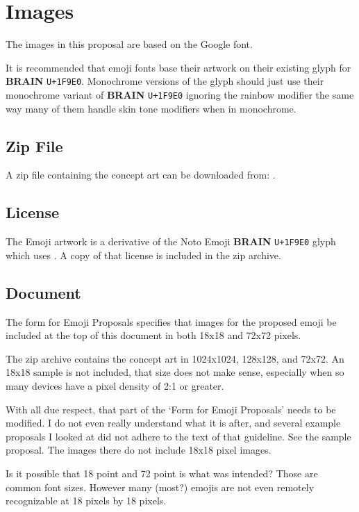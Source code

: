 \section{Images}

The images in this proposal are based on the Google\textsuperscript{\textregistered}
 font.

It is recommended that emoji fonts base their artwork on their existing glyph for
\textbf{BRAIN} \texttt{U+1F9E0}. Monochrome versions of the glyph should just use their
monochrome variant of \textbf{BRAIN} \texttt{U+1F9E0} ignoring the rainbow modifier the
same way many of them handle skin tone modifiers when in monochrome.

\subsection{Zip File}
A zip file containing the concept art can be downloaded from:
.

\subsection{License}

The Emoji artwork is a derivative of the Noto Emoji \textbf{BRAIN} \texttt{U+1F9E0} glyph
which uses .
A copy of that license is included in the zip archive.

\subsection{Document}

The form for Emoji Proposals specifies that images for the proposed emoji be included at
the top of this document in both 18x18 and 72x72 pixels.

The zip archive contains the concept art in 1024x1024, 128x128, and 72x72. An 18x18 sample
is not included, that size does not make sense, especially when so many devices have a pixel
density of 2:1 or greater.

With all due respect, that part of the `Form for Emoji Proposals' needs to be modified. I do
not even really understand what it is after, and several example proposals I looked at did
not adhere to the text of that guideline. See the
sample proposal. The images there do not include 18x18 pixel images.

Is it possible that 18 point and 72 point is what was intended? Those are common font sizes.
However many (most?) emojis are not even remotely recognizable at 18 pixels by 18 pixels.

